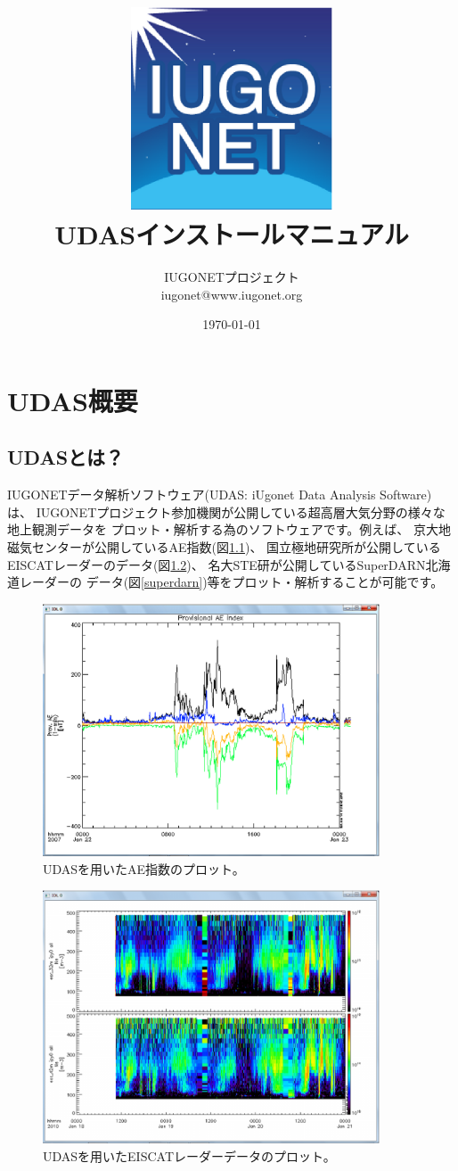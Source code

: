 \documentclass[a4j]{jbook}
\title{\includegraphics[width=6cm]{images/eclipse256.eps}\\UDASインストールマニュアル}
\author{IUGONETプロジェクト\\iugonet@www.iugonet.org}
\date{\today}
\begin{document}
\maketitle
\tableofcontents

\part{UDAS概要}
\label{udas_abstract}
\chapter{UDASとは？}
\label{whats_udas}

IUGONETデータ解析ソフトウェア(UDAS: iUgonet Data Analysis Software)は、
IUGONETプロジェクト参加機関が公開している超高層大気分野の様々な地上観測データを
プロット・解析する為のソフトウェアです。例えば、
京大地磁気センターが公開しているAE指数(図\ref{ae})、
国立極地研究所が公開しているEISCATレーダーのデータ(図\ref{eiscat})、
名大STE研が公開しているSuperDARN北海道レーダーの
データ(図\ref{superdarn})等をプロット・解析することが可能です。
\begin{figure}[H]
\begin{center}
\includegraphics[width=10cm]{images/screenshot_iug_crib_gmag_wdc.eps}
\caption{UDASを用いたAE指数のプロット。}
\label{ae}
\end{center}
\end{figure}

\begin{figure}[H]
\begin{center}
\includegraphics[width=10cm]{images/screenshot_iug_crib_eiscat.eps}
\caption{UDASを用いたEISCATレーダーデータのプロット。}
\label{eiscat}
\end{center}
\end{figure}
\end{document}
